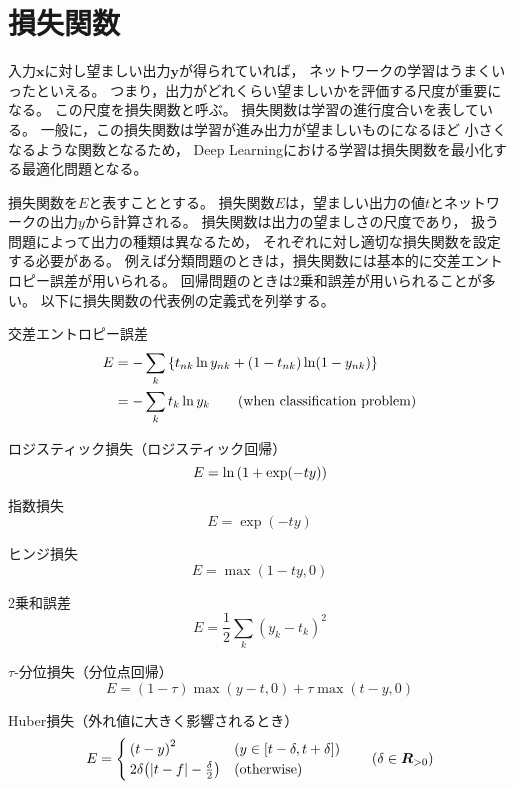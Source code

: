 \documentclass[class=jsarticle, crop=false, dvipdfmx, fleqn]{standalone}
\begin{document}
\section{損失関数}
\label{sec:loss_function}

入力$\bm{x}$に対し望ましい出力$\bm{y}$が得られていれば，
ネットワークの学習はうまくいったといえる。
つまり，出力がどれくらい望ましいかを評価する尺度が重要になる。
この尺度を損失関数と呼ぶ。
損失関数は学習の進行度合いを表している。
一般に，この損失関数は学習が進み出力が望ましいものになるほど
小さくなるような関数となるため，
Deep Learningにおける学習は損失関数を最小化する最適化問題となる。

損失関数を$E$と表すこととする。
損失関数$E$は，望ましい出力の値$t$とネットワークの出力$y$から計算される。
損失関数は出力の望ましさの尺度であり，
扱う問題によって出力の種類は異なるため，
それぞれに対し適切な損失関数を設定する必要がある。
例えば分類問題のときは，損失関数には基本的に交差エントロピー誤差が用いられる。
回帰問題のときは2乗和誤差が用いられることが多い。
以下に損失関数の代表例の定義式を列挙する。

交差エントロピー誤差
\begin{align}
E & = - \sum_k \qty{ t_{nk} \ln y_{nk} + (1 - t_{nk}) \ln (1 - y_{nk}) } \\
	& =  - \sum_k t_k \ln y_k  \qquad (\text{when classification problem})
\end{align}

ロジスティック損失（ロジスティック回帰）
\begin{equation}
E = \ln\qty(1 + \exp(-ty))
\end{equation}

指数損失
\begin{equation}
E = \exp(-ty)
\end{equation}

ヒンジ損失
\begin{equation}
E = \max(1 - ty, 0)
\end{equation}

2乗和誤差
\begin{equation}
E = \frac{1}{2} \sum_k (y_k - t_k)^2
\end{equation}

$\tau$-分位損失（分位点回帰）
\begin{equation}
E = (1 - \tau) \max(y-t, 0) + \tau \max(t-y, 0)
\end{equation}

Huber損失（外れ値に大きく影響されるとき）
\begin{equation}
E =
	\begin{cases}
		\qty(t - y)^2 & (y \in \qty[t-\delta, t+\delta]) \\
		2\delta \qty(|t - f| - \frac{\delta}{2}) & (\mathrm{otherwise})
	\end{cases}
	\qquad \qty(\delta \in \bm{R}_{>0})
\end{equation}
\end{document}
